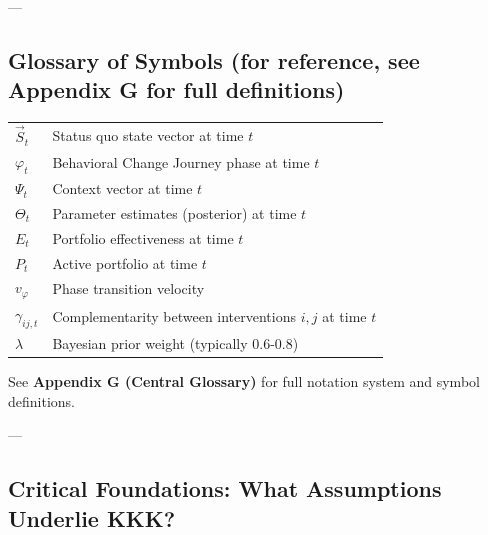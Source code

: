 ---


\subsection*{Glossary of Symbols (for reference, see Appendix G for full definitions)}

\begin{center}
\begin{tabular}{ll}
$\vec{S}_t$ & Status quo state vector at time $t$ \\
$\varphi_t$ & Behavioral Change Journey phase at time $t$ \\
$\Psi_t$ & Context vector at time $t$ \\
$\Theta_t$ & Parameter estimates (posterior) at time $t$ \\
$E_t$ & Portfolio effectiveness at time $t$ \\
$P_t$ & Active portfolio at time $t$ \\
$v_\varphi$ & Phase transition velocity \\
$\gamma_{ij,t}$ & Complementarity between interventions $i,j$ at time $t$ \\
$\lambda$ & Bayesian prior weight (typically 0.6-0.8) \\
\end{tabular}
\end{center}

See \textbf{Appendix G (Central Glossary)} for full notation system and symbol definitions.

---


\subsection*{Critical Foundations: What Assumptions Underlie KKK?}

